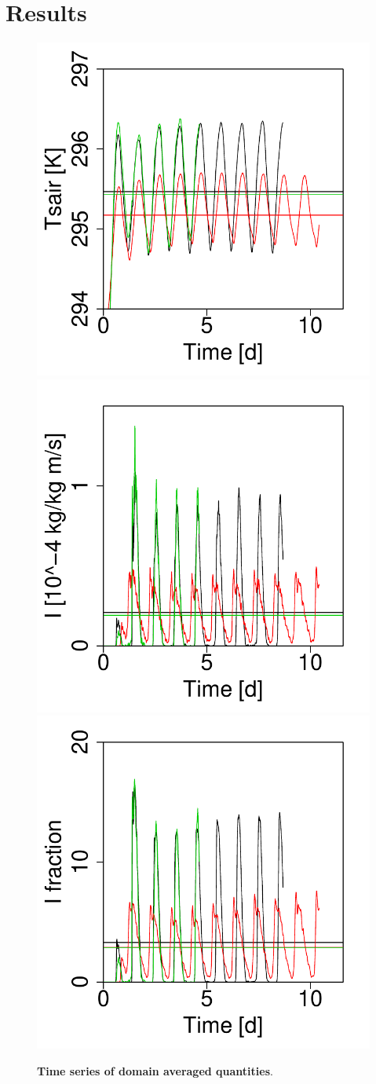 \documentclass[draft]{agujournal2019}
\begin{document}
\section{Results}\label{sec:results}


\begin{figure}
\centering
\includegraphics[trim={0 0 0cm 0}, clip, height=0.32\linewidth]{tsair_timeseries.pdf}
\includegraphics[trim={0 0 0cm 0}, clip, height=0.32\linewidth]{prcp_timeseries.pdf}
\includegraphics[trim={0 0 0cm 0}, clip, height=0.32\linewidth]{pfrac_timeseries.pdf}
\caption{{\bf Time series of domain averaged quantities}. }
\label{fig:domain_mean_timeseries}
\end{figure}
\end{document}
